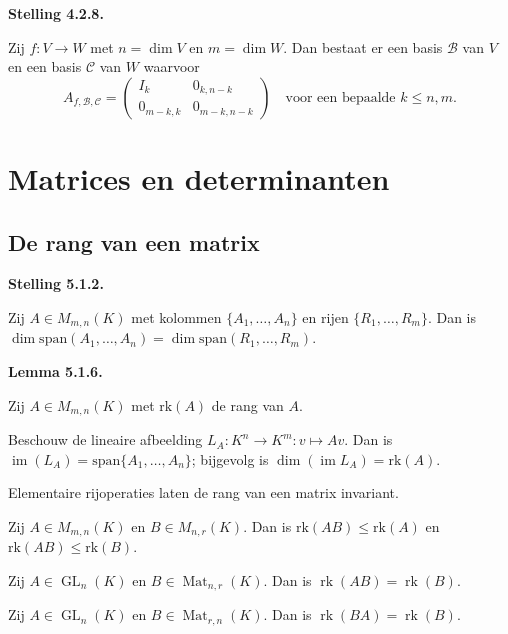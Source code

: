\documentclass[10pt,a4paper]{article}
\newenvironment{res}[2]{%
  \par\noindent\textbf{#1 #2.}%
}{%
  \par\vspace{2pt}\normalfont
}
\begin{document}
\begin{res}{Stelling}{4.2.8}
Zij $f:V\to W$ met $n=\dim V$ en $m=\dim W$. Dan bestaat er een basis $\mathcal B$ van $V$ en een basis $\mathcal C$ van $W$ waarvoor
\[
A_{f,\mathcal B,\mathcal C}=\left(\begin{array}{c|c} I_k & 0_{k,n-k}\\\hline 0_{m-k,k} & 0_{m-k,n-k}\end{array}\right)\quad\text{voor een bepaalde } k\le n,m.
\]
\end{res}

\section{Matrices en determinanten}
\subsection{De rang van een matrix}
\begin{res}{Stelling}{5.1.2}
Zij $A\in M_{m,n}(K)$ met kolommen $\{A_1,\dots,A_n\}$ en rijen $\{R_1,\dots,R_m\}$. Dan is $\dim\mathrm{span}(A_1,\dots,A_n)=\dim\mathrm{span}(R_1,\dots,R_m)$.
\end{res}

\begin{res}{Lemma}{5.1.6}
Zij $A\in M_{m,n}(K)$ met $\mathrm{rk}(A)$ de rang van $A$.
\begin{myenum}
\item Beschouw de lineaire afbeelding $L_A:K^n\to K^m:v\mapsto Av$. Dan is $\operatorname{im}(L_A)=\mathrm{span}\{A_1,\dots,A_n\}$; bijgevolg is $\dim(\operatorname{im}L_A)=\mathrm{rk}(A)$.
\item Elementaire rijoperaties laten de rang van een matrix invariant.
\item Zij $A\in M_{m,n}(K)$ en $B\in M_{n,r}(K)$. Dan is $\mathrm{rk}(AB)\le\mathrm{rk}(A)$ en $\mathrm{rk}(AB)\le\mathrm{rk}(B)$.

\item Zij $A \in \operatorname{GL}_n(K)$ en $B \in \operatorname{Mat}_{n,r}(K)$. Dan is $\operatorname{rk}(AB) = \operatorname{rk}(B)$.

\item Zij $A \in \operatorname{GL}_n(K)$ en $B \in \operatorname{Mat}_{r,n}(K)$. Dan is $\operatorname{rk}(BA) = \operatorname{rk}(B)$.
\end{myenum}
\end{res}
\end{document}
